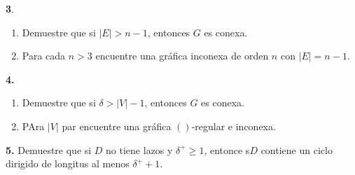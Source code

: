 \documentclass[12pt]{article}
\begin{document}
%
%
\textbf{3}.

\begin{enumerate}[label=\alph*)]

    \item Demuestre que si $\mid E \mid > n - 1$, entonces $G$ es conexa.
    \begin{tcolorbox}[title=\textbf{Hipotesis}, colback=red!15!white, colframe=black!]

    \end{tcolorbox}
    \begin{tcolorbox}[title=\textbf{Definiciones}, colback=blue!15!white, colframe=black!]
    
    \end{tcolorbox}

    \item Para cada $n > 3$ encuentre una gráfica inconexa de orden $n$ con $|E| = n - 1$.
    \begin{tcolorbox}[title=\textbf{Hipotesis}, colback=red!15!white, colframe=black!]

    \end{tcolorbox}
    \begin{tcolorbox}[title=\textbf{Definiciones}, colback=blue!15!white, colframe=black!]
    
    \end{tcolorbox}
\end{enumerate}

\vspace{1cm}
%
%
\textbf{4.}


\begin{enumerate}[label=\alph*)]

    \item Demuestre que si $\delta > |V| - 1$, entonces $G$ es conexa.
    \begin{tcolorbox}[title=\textbf{Hipotesis}, colback=red!15!white, colframe=black!]

    \end{tcolorbox}
    \begin{tcolorbox}[title=\textbf{Definiciones}, colback=blue!15!white, colframe=black!]
    
    \end{tcolorbox}

    \item PAra $|V|$ par encuentre una gráfica $()$-regular e inconexa.
    \begin{tcolorbox}[title=\textbf{Hipotesis}, colback=red!15!white, colframe=black!]

    \end{tcolorbox}
    \begin{tcolorbox}[title=\textbf{Definiciones}, colback=blue!15!white, colframe=black!]
    
    \end{tcolorbox}
\end{enumerate}

\vspace{1cm}

%
%
\textbf{5.} Demuestre que si $D$ no tiene lazos y $\delta^+ \geq 1$, entonce s$D$ contiene un ciclo dirigido de longitus
al menos $\delta^+ + 1$.\\

\begin{tcolorbox}[title=\textbf{Definiciones}, colback=blue!15!white, colframe=black!]

\end{tcolorbox}
\end{document}

